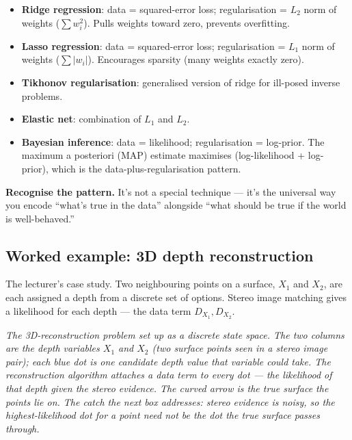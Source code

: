 \documentclass[11pt, a4paper]{article}
\begin{document}
\begin{itemize}
  \item \textbf{Ridge regression}: data = squared-error loss; regularisation = $L_2$ norm of weights ($\sum w_i^2$). Pulls weights toward zero, prevents overfitting.
  \item \textbf{Lasso regression}: data = squared-error loss; regularisation = $L_1$ norm of weights ($\sum |w_i|$). Encourages sparsity (many weights exactly zero).
  \item \textbf{Tikhonov regularisation}: generalised version of ridge for ill-posed inverse problems.
  \item \textbf{Elastic net}: combination of $L_1$ and $L_2$.
  \item \textbf{Bayesian inference}: data = likelihood; regularisation = log-prior. The maximum a posteriori (MAP) estimate maximises (log-likelihood + log-prior), which is the data-plus-regularisation pattern.
\end{itemize}

\textbf{Recognise the pattern.} It's not a special technique — it's the universal way you encode ``what's true in the data'' alongside ``what should be true if the world is well-behaved.''

\subsection{Worked example: 3D depth reconstruction}

The lecturer's case study. Two neighbouring points on a surface, $X_1$ and $X_2$, are each assigned a depth from a discrete set of options. Stereo image matching gives a likelihood for each depth — the data term $D_{X_1}, D_{X_2}$.

\begin{center}

\footnotesize\textit{The 3D-reconstruction problem set up as a discrete state space. The two columns are the depth variables $X_1$ and $X_2$ (two surface points seen in a stereo image pair); each blue dot is one \emph{candidate depth value} that variable could take. The reconstruction algorithm attaches a \emph{data term} to every dot --- the likelihood of that depth given the stereo evidence. The curved arrow is the true surface the points lie on. The catch the next box addresses: stereo evidence is noisy, so the highest-likelihood dot for a point need not be the dot the true surface passes through.}
\end{center}
\end{document}

